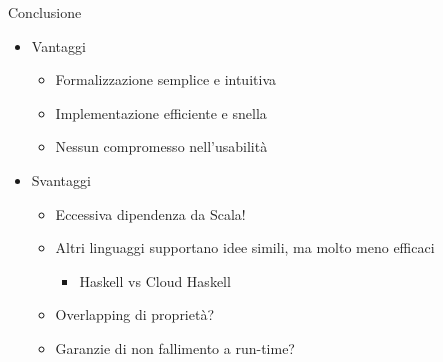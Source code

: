 \begin{frame}{Conclusione}
	\begin{itemize}
		\item Vantaggi
		\begin{itemize}
			\item Formalizzazione semplice e intuitiva
			\item Implementazione efficiente e snella
			\item Nessun compromesso nell'usabilità
		\end{itemize}
		\item Svantaggi
		\begin{itemize}
			\item Eccessiva dipendenza da Scala!
			\item Altri linguaggi supportano idee simili, ma molto meno efficaci
			\begin{itemize}
				\item Haskell vs Cloud Haskell
			\end{itemize}
			\item Overlapping di proprietà?
			\item Garanzie di non fallimento a run-time?
		\end{itemize}
	\end{itemize}
\end{frame}